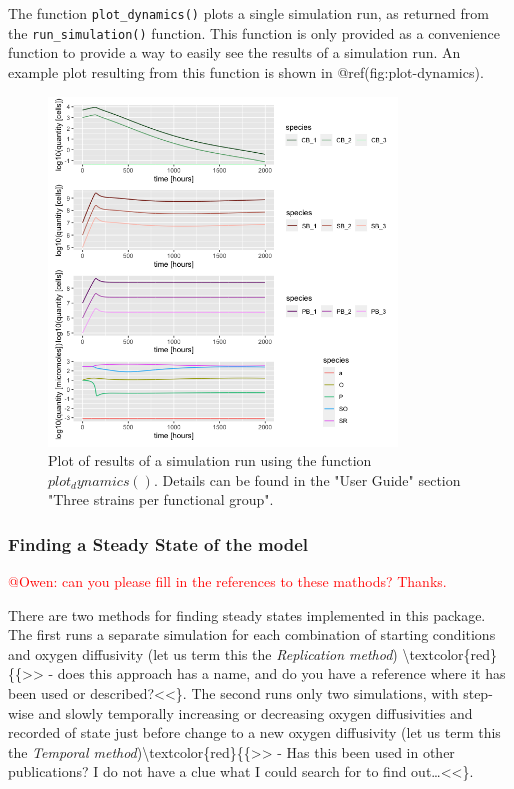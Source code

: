 \documentclass[]{elsarticle} %
\begin{document}
The function \texttt{plot\_dynamics()} plots a single simulation run, as
returned from the \texttt{run\_simulation()} function. This function is
only provided as a convenience function to provide a way to easily see
the results of a simulation run. An example plot resulting from this
function is shown in @ref(fig:plot-dynamics).

\begin{figure}

{\centering \includegraphics[width=350px]{figures/ug_three_strains_dynamics} 

}

\caption{Plot of results of a simulation run using the function $plot_dynamics()$. Details can be found in the "User Guide" section "Three strains per functional group".}\label{fig:plot-dynamics}
\end{figure}

\hypertarget{finding-a-steady-state-of-the-model}{%
\subsubsection{Finding a Steady State of the
model}\label{finding-a-steady-state-of-the-model}}

\textcolor{red}{@Owen: can you please fill in the references to these mathods? Thanks.}

There are two methods for finding steady states implemented in this
package. The first runs a separate simulation for each combination of
starting conditions and oxygen diffusivity (let us term this the
\emph{Replication method})
\textbackslash textcolor\{red\}\{\{\textgreater\textgreater{}\citet{Owen}
- does this approach has a name, and do you have a reference where it
has been used or described?\textless\textless\}. The second runs only
two simulations, with step-wise and slowly temporally increasing or
decreasing oxygen diffusivities and recorded of state just before change
to a new oxygen diffusivity (let us term this the \emph{Temporal
method})\textbackslash textcolor\{red\}\{\{\textgreater\textgreater{}\citet{Owen}
- Has this been used in other publications? I do not have a clue what I
could search for to find out\ldots\textless\textless\}.
\end{document}
